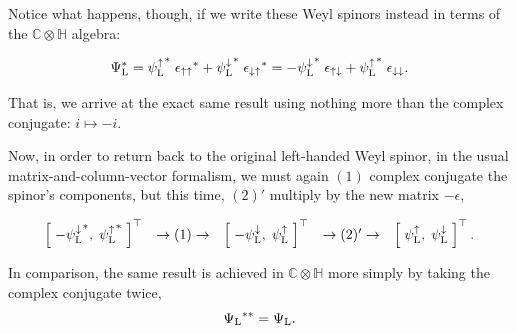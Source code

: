 \documentclass[letterpaper,12pt,titlepage,oneside,final]{book}
\newcommand{\CH}{\mathbb{C}\otimes\mathbb{H}}
\begin{document}
Notice what happens, though, if we write these Weyl spinors instead in terms of the $\CH$ algebra:

\begin{equation}\label{new}\Psi_{\textup{L}}^* = {\psi^{\uparrow}_{\textup{L}}}^* \hspace{1mm} {\epsilon_{\uparrow \uparrow}}^* +  {\psi^{\downarrow}_{\textup{L}}}^* \hspace{1mm} {\epsilon_{\downarrow \uparrow}}^* = -{\psi^{\downarrow}_{\textup{L}}}^* \hspace{1mm} {\epsilon_{\uparrow \downarrow}} + {\psi^{\uparrow}_{\textup{L}}}^* \hspace{1mm}{\epsilon_{\downarrow \downarrow}}.
\end{equation}

\noindent That is, we arrive at the exact same result using nothing more than the complex conjugate:  $i\mapsto-i$.

\vspace{1cm}

Now, in order to return back to the original left-handed Weyl spinor, in the usual matrix-and-column-vector formalism, we must again $(1)$ complex conjugate the spinor's components, but this time, $(2)'$ multiply by the new matrix $-\epsilon$,

\begin{equation} \begin{array}{lllll}
 \left[\hspace{1mm}-{\psi^{\downarrow}_{\textup{L}}}^* , \hspace{1mm} {\psi^{\uparrow}_{\textup{L}}}^*\hspace{1mm}\right]^{\top} & \rightarrow (1) \rightarrow & \left[\hspace{1mm}-{\psi^{\downarrow}_{\textup{L}}} , \hspace{1mm} {\psi^{\uparrow}_{\textup{L}}}\hspace{1mm}\right]^{\top} & \rightarrow (2)' \rightarrow& 
\left[\hspace{1mm}\psi^{\uparrow}_{\textup{L}} , \hspace{1mm} \psi^{\downarrow}_{\textup{L}}\hspace{1mm}\right]^{\top}. 
\end{array}\end{equation}

\noindent In comparison, the same result is achieved in $\CH$ more simply by taking the complex conjugate twice,
\begin{equation}\label{psicc}{\Psi_{\textup{L}}}^{**} = \Psi_{\textup{L}}.
\end{equation}
\end{document}
